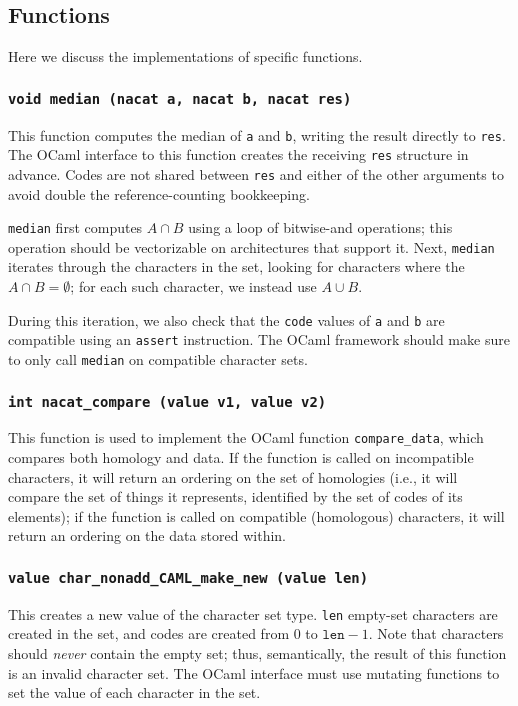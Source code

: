 \documentclass{article}
\begin{document}
\subsection*{Functions}
\label{sec:functions}

Here we discuss the implementations of specific functions.

\subsubsection*{\texttt{void median (nacat a, nacat b, nacat res)}}
This function computes the median of \texttt{a} and \texttt{b}, writing the
result directly to \texttt{res}.  The OCaml interface to this function creates
the receiving \texttt{res} structure in advance.  Codes are not shared between
\texttt{res} and either of the other arguments to avoid double the
reference-counting bookkeeping.

\texttt{median} first computes $A \cap B$ using a loop of bitwise-and operations;
this operation should be vectorizable on architectures that support it.  Next,
\texttt{median} iterates through the characters in the set, looking for
characters where the $A \cap B = \emptyset$; for each such character, we instead use
$A \cup B.$

During this iteration, we also check that the \texttt{code} values of \texttt{a}
and \texttt{b} are compatible using an \texttt{assert} instruction.  The OCaml
framework should make sure to only call \texttt{median} on compatible character
sets.


\subsubsection*{\texttt{int nacat\_compare (value v1, value v2)}}
This function is used to implement the OCaml function \texttt{compare\_data},
which compares both homology and data.  If the function is called on
incompatible characters, it will return an ordering on the set of homologies
(i.e., it will compare the set of things it represents, identified by the set of
codes of its elements); if the function is called on compatible (homologous)
characters, it will return an ordering on the data stored within.

\subsubsection*{\texttt{value char\_nonadd\_CAML\_make\_new (value len)}}
This creates a new value of the character set type.  \texttt{len} empty-set
characters are created in the set, and codes are created from 0 to $\mathtt{len}
- 1$.  Note that characters should \textit{never} contain the empty set; thus,
semantically, the result of this function is an invalid character set.  The
OCaml interface must use mutating functions to set the value of each character
in the set.
\end{document}
